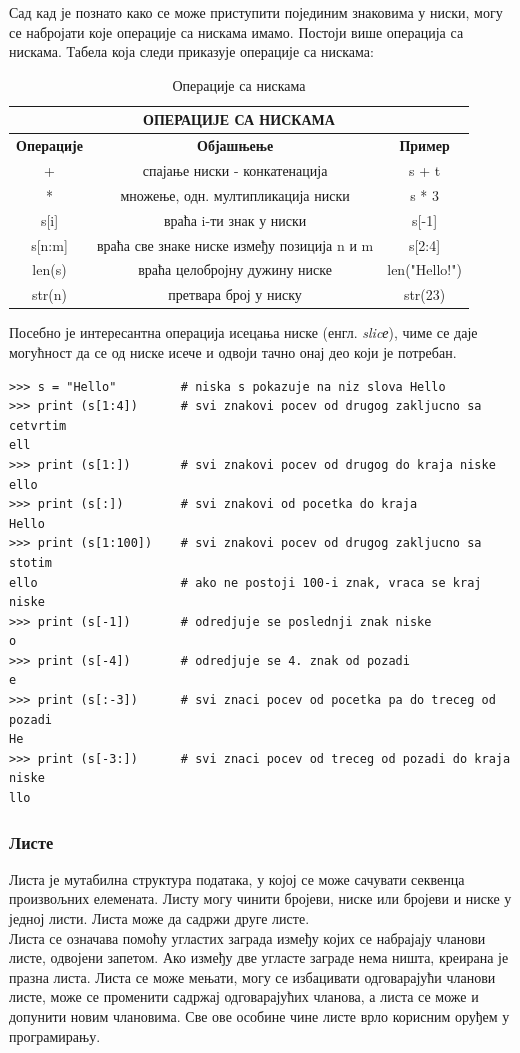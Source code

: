\documentclass[11pt, serbianc, english, titlepage]{article}
\begin{document}
		Сад кад је познато како се може приступити појединим знаковима у ниски, могу се набројати које операције са нискама имамо. Постоји више операција са нискама. Табела која следи приказује операције са нискама:
		\begin{table}[h]
		\centering
		\begin{tabular}{|c|c|c|} \hline
		\multicolumn{3}{|c|}{\textbf{ОПЕРАЦИЈЕ СА НИСКАМА}}\\ \hline
		\textbf{Операције} & \textbf{Објашњење} & \textbf{Пример} \\ \hline
		+ & спајање ниски - конкатенација & s + t \\ \hline
		* & множење, одн. мултипликација ниски & s * 3 \\ \hline
		s[i] & враћа i-ти знак у ниски & s[-1] \\ \hline
		s[n:m] & враћа све знаке ниске између позиција n и m & s[2:4] \\ \hline
		len(s) & враћа целобројну дужину ниске & len("Hello!") \\ \hline
		str(n) & претвара број у ниску & str(23) \\ \hline
		\end{tabular}\medskip
		\caption{Операције са нискама}
		\label{tabele:strings}
		\end{table}
		
		Посебно је интересантна операција исецања ниске (енгл. \emph{slicе}), чиме се даје могућност да се од ниске исече и одвоји тачно онај део који је потребан.
		\begin{lstlisting}[caption = Комадање ниске, label = slice]
>>> s = "Hello"         # niska s pokazuje na niz slova Hello
>>> print (s[1:4])      # svi znakovi pocev od drugog zakljucno sa cetvrtim
ell
>>> print (s[1:])       # svi znakovi pocev od drugog do kraja niske
ello
>>> print (s[:])        # svi znakovi od pocetka do kraja
Hello
>>> print (s[1:100])    # svi znakovi pocev od drugog zakljucno sa stotim
ello                    # ako ne postoji 100-i znak, vraca se kraj niske
>>> print (s[-1])       # odredjuje se poslednji znak niske
o
>>> print (s[-4])       # odredjuje se 4. znak od pozadi
e
>>> print (s[:-3])      # svi znaci pocev od pocetka pa do treceg od pozadi
He
>>> print (s[-3:])      # svi znaci pocev od treceg od pozadi do kraja niske
llo		

\end{lstlisting}
		\subsubsection{Листе}
		Листа је мутабилна структура података, у којој се може сачувати секвенца произвољних елемената. Листу могу чинити бројеви, ниске или бројеви и ниске у једној листи. Листа може да садржи друге листе.\\
		 Листа се означава помоћу угластих заграда између којих се набрајају чланови листе, одвојени запетом. Ако између две угласте заграде нема ништа, креирана је празна листа. Листа се може мењати, могу се избацивати одговарајући чланови листе, може се променити садржај одговарајућих чланова, а листа се може и допунити новим члановима. Све ове особине чине листе врло корисним оруђем у програмирању.\\
		 
\end{document}
